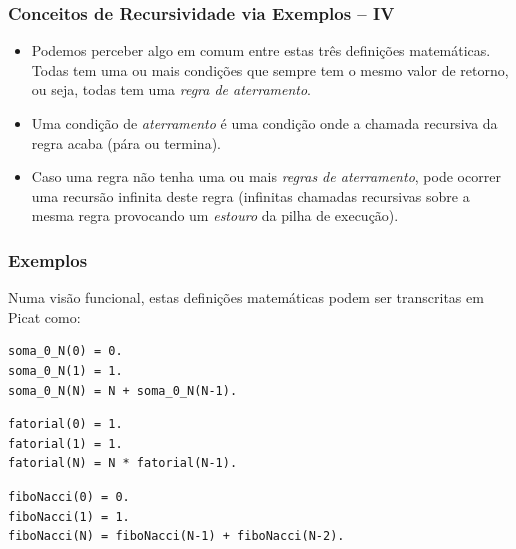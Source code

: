 \begin{frame}[fragile]

\frametitle{Conceitos de Recursividade via Exemplos -- IV}

  \begin{itemize}
      
      \item Podemos perceber algo em comum entre estas três definições matemáticas. 
      Todas tem uma ou mais
      condições que sempre tem o mesmo valor de retorno, ou seja, 
      todas tem uma \textit{regra de  aterramento}.
      
      \pause
      \item Uma condição de \textit{aterramento} é uma condição onde a chamada recursiva da regra
      acaba (pára ou termina).
      
       \pause
      \item Caso uma regra não tenha uma ou mais  \textit{regras de aterramento}, 
      pode ocorrer uma recursão infinita deste regra  (infinitas chamadas recursivas
      sobre a mesma regra provocando um \textit{estouro} da pilha de execução).
  \end{itemize}

\end{frame}

\begin{frame}[fragile]

\frametitle{Exemplos}

Numa visão funcional, estas definições
 matemáticas podem ser transcritas em Picat como:

\begin{lstlisting}[frame=single]
soma_0_N(0) = 0.
soma_0_N(1) = 1.
soma_0_N(N) = N + soma_0_N(N-1).
\end{lstlisting}

\begin{lstlisting}[frame=single]
fatorial(0) = 1.
fatorial(1) = 1.
fatorial(N) = N * fatorial(N-1).
\end{lstlisting}

\begin{lstlisting}[frame=single]
fiboNacci(0) = 0.
fiboNacci(1) = 1.
fiboNacci(N) = fiboNacci(N-1) + fiboNacci(N-2).
\end{lstlisting}

\end{frame}


